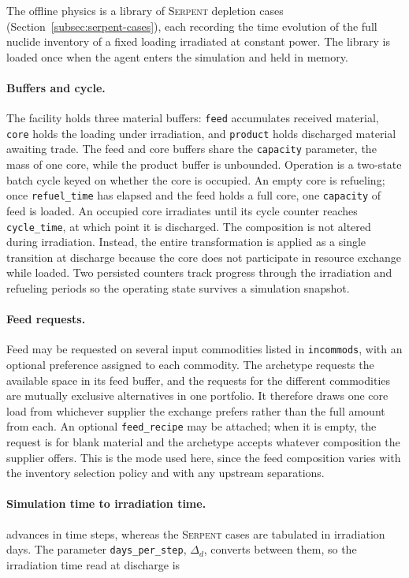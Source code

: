 The offline physics is a library of \textsc{Serpent} depletion cases
(Section~\ref{subsec:serpent-cases}), each recording the time evolution of the
full nuclide inventory of a fixed loading irradiated at constant power. The
library is loaded once when the agent enters the simulation and held in memory.

\paragraph{Buffers and cycle.}
The facility holds three material buffers: \texttt{feed} accumulates received
material, \texttt{core} holds the loading under irradiation, and \texttt{product}
holds discharged material awaiting trade. The feed and core buffers share the
\texttt{capacity} parameter, the mass of one core, while the product buffer is
unbounded. Operation is a two-state batch cycle keyed on whether the core is
occupied. An empty core is refueling; once \texttt{refuel\_time} has elapsed and
the feed holds a full core, one \texttt{capacity} of feed is loaded. An occupied
core irradiates until its cycle counter reaches \texttt{cycle\_time}, at which
point it is discharged. The composition is not altered during irradiation.
Instead, the entire transformation is applied as a single transition at
discharge because the core does not participate in resource exchange while
loaded. Two persisted
counters track progress through the irradiation and refueling periods so the
operating state survives a simulation snapshot.

\paragraph{Feed requests.}
Feed may be requested on several input commodities listed in \texttt{incommods},
with an optional preference assigned to each commodity. The archetype requests
the available space in its feed buffer, and the requests for the different
commodities are mutually exclusive alternatives in one portfolio. It therefore
draws one core load from whichever supplier the exchange prefers rather than the
full amount from each. An optional \texttt{feed\_recipe} may be attached; when it is empty, the request is
for blank material and the archetype accepts whatever composition the supplier
offers. This is the mode used here, since the feed composition varies with the
inventory selection policy and with any upstream separations.

\paragraph{Simulation time to irradiation time.}
\Cyclus advances in time steps, whereas the \textsc{Serpent} cases are tabulated in
irradiation days. The parameter \texttt{days\_per\_step}, $\Delta_d$, converts
between them, so the irradiation time read at discharge is

